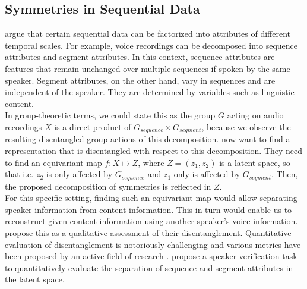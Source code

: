 \documentclass{article} %
\begin{document}
\subsection*{Symmetries in Sequential Data}
\citet{hsu2017unsupervised} argue that certain sequential data can be factorized into attributes of different temporal scales. For example, voice recordings can be decomposed into sequence attributes and segment attributes. In this context, sequence attributes are features that remain unchanged over multiple sequences if spoken by the same speaker. Segment attributes, on the other hand, vary in sequences and are independent of the speaker. They are determined by variables such as linguistic content.\\
In group-theoretic terms, we could state this as the group $G$ acting on audio recordings $X$ is a direct product of $G_{sequence} \times G_{segment}$, because we observe the resulting disentangled group actions of this decomposition. \citet{hsu2017unsupervised} now want to find a representation that is disentangled with respect to this decomposition. They need to find an equivariant map $f:X\mapsto Z$, where $Z = (z_1, z_2)$ is a latent space, so that i.e. $z_2$ is only affected by $G_{sequence}$ and $z_1$ only is affected by $G_{segment}$. Then, the proposed decomposition of symmetries is reflected in $Z$.\\
For this specific setting, finding such an equivariant map would allow separating speaker information from content information. This in turn would enable us to reconstruct given content information using another speaker's voice information. \citet{hsu2017unsupervised} propose this as a qualitative assessment of their disentanglement. Quantitative evaluation of disentanglement is notoriously challenging and various metrics have been proposed by an active field of research \cite{locatello2019challenging, higgins2016beta}. \citet{hsu2017unsupervised} propose a speaker verification task to quantitatively evaluate the separation of sequence and segment attributes in the latent space.
\end{document}
